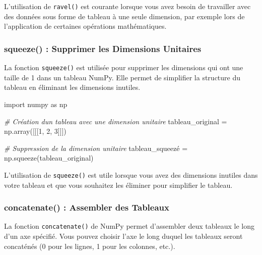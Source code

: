 \documentclass[11pt]{article}
\newenvironment{Shaded}{}{}
\newcommand{\DecValTok}[1]{\textcolor[rgb]{0.25,0.63,0.44}{{#1}}}
\newcommand{\CommentTok}[1]{\textcolor[rgb]{0.38,0.63,0.69}{\textit{{#1}}}}
\newcommand{\NormalTok}[1]{{#1}}
\newcommand{\ImportTok}[1]{{#1}}
\newcommand{\OperatorTok}[1]{\textcolor[rgb]{0.40,0.40,0.40}{{#1}}}
\begin{document}
L'utilisation de \texttt{ravel()} est courante lorsque vous avez besoin
de travailler avec des données sous forme de tableau à une seule
dimension, par exemple lors de l'application de certaines opérations
mathématiques.

\hypertarget{squeeze-supprimer-les-dimensions-unitaires}{%
\subsubsection{\texorpdfstring{\textbf{squeeze() : Supprimer les
Dimensions
Unitaires}}{squeeze() : Supprimer les Dimensions Unitaires}}\label{squeeze-supprimer-les-dimensions-unitaires}}

La fonction \texttt{squeeze()} est utilisée pour supprimer les
dimensions qui ont une taille de 1 dans un tableau NumPy. Elle permet de
simplifier la structure du tableau en éliminant les dimensions inutiles.

\begin{Shaded}
\begin{Highlighting}[]
\ImportTok{import}\NormalTok{ numpy }\ImportTok{as}\NormalTok{ np}

\CommentTok{\# Création d\textquotesingle{}un tableau avec une dimension unitaire}
\NormalTok{tableau\_original }\OperatorTok{=}\NormalTok{ np.array([[[}\DecValTok{1}\NormalTok{, }\DecValTok{2}\NormalTok{, }\DecValTok{3}\NormalTok{]]])}

\CommentTok{\# Suppression de la dimension unitaire}
\NormalTok{tableau\_squeezé }\OperatorTok{=}\NormalTok{ np.squeeze(tableau\_original)}
\end{Highlighting}
\end{Shaded}

L'utilisation de \texttt{squeeze()} est utile lorsque vous avez des
dimensions inutiles dans votre tableau et que vous souhaitez les
éliminer pour simplifier le tableau.

\hypertarget{concatenate-assembler-des-tableaux}{%
\subsubsection{\texorpdfstring{\textbf{concatenate() : Assembler des
Tableaux}}{concatenate() : Assembler des Tableaux}}\label{concatenate-assembler-des-tableaux}}

La fonction \texttt{concatenate()} de NumPy permet d'assembler deux
tableaux le long d'un axe spécifié. Vous pouvez choisir l'axe le long
duquel les tableaux seront concaténés (0 pour les lignes, 1 pour les
colonnes, etc.).
\end{document}
